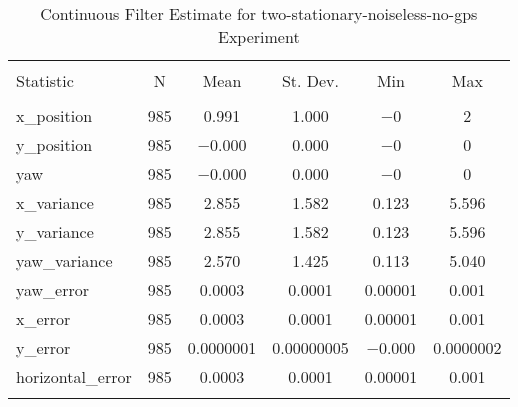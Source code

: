 
\begin{table}[h] \centering 
  \caption{Continuous Filter Estimate for two-stationary-noiseless-no-gps Experiment} 
  \label{tab:two_stationary_noiseless_no_gps_continuous_summary} 
\begin{tabular}{@{\extracolsep{5pt}}lccccc} 
\\[-1.8ex]\hline 
\hline \\[-1.8ex] 
Statistic & \multicolumn{1}{c}{N} & \multicolumn{1}{c}{Mean} & \multicolumn{1}{c}{St. Dev.} & \multicolumn{1}{c}{Min} & \multicolumn{1}{c}{Max} \\ 
\hline \\[-1.8ex] 
x\_position & 985 & 0.991 & 1.000 & $-$0 & 2 \\ 
y\_position & 985 & $-$0.000 & 0.000 & $-$0 & 0 \\ 
yaw & 985 & $-$0.000 & 0.000 & $-$0 & 0 \\ 
x\_variance & 985 & 2.855 & 1.582 & 0.123 & 5.596 \\ 
y\_variance & 985 & 2.855 & 1.582 & 0.123 & 5.596 \\ 
yaw\_variance & 985 & 2.570 & 1.425 & 0.113 & 5.040 \\ 
yaw\_error & 985 & 0.0003 & 0.0001 & 0.00001 & 0.001 \\ 
x\_error & 985 & 0.0003 & 0.0001 & 0.00001 & 0.001 \\ 
y\_error & 985 & 0.0000001 & 0.00000005 & $-$0.000 & 0.0000002 \\ 
horizontal\_error & 985 & 0.0003 & 0.0001 & 0.00001 & 0.001 \\ 
\hline \\[-1.8ex] 
\end{tabular} 
\end{table} 
